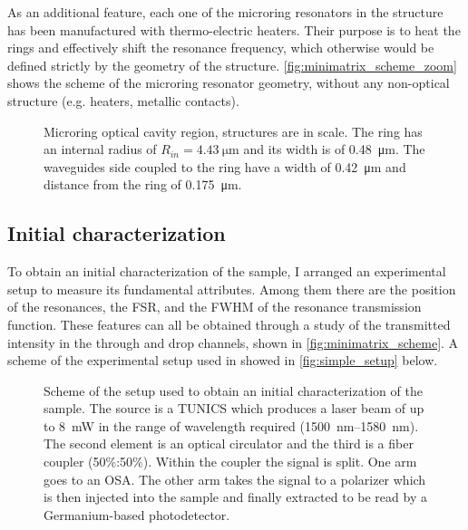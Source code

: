 As an additional feature, each one of the microring resonators in the structure has been manufactured with thermo-electric heaters.
Their purpose \cite{testa2016design} is to heat the rings and effectively shift the resonance frequency, which otherwise would be defined strictly by the geometry of the structure.
\autoref{fig:minimatrix_scheme_zoom} shows the scheme of the microring resonator geometry, without any non-optical structure (e.g. heaters, metallic contacts).

\begin{figure}[htbp]
	\centering
	
	\caption{
	Microring optical cavity region, structures are in scale.
	The ring has an internal radius of $R_{in}=\SI{4.43}{\um}$ and its width is of \SI{0.48}{\um}.
	The waveguides side coupled to the ring have a width of \SI{0.42}{\um} and distance from the ring of \SI{.175}{\um}.
	}
	\label{fig:minimatrix_scheme_zoom}
\end{figure}

\subsection{Initial characterization}
\label{ssec:initial_characterization}
To obtain an initial characterization of the sample, I arranged an experimental setup to measure its fundamental attributes.
Among them there are the position of the resonances, the \acf{FSR}, and the \acf{FWHM} of the resonance transmission function.
These features can all be obtained through a study of the transmitted intensity in the through and drop channels, shown in \autoref{fig:minimatrix_scheme}.
A scheme of the experimental setup used in showed in \autoref{fig:simple_setup} below.

\begin{figure}
	\centering
	
	\caption{Scheme of the setup used to obtain an initial characterization of the sample.
		The source is a TUNICS which produces a laser beam of up to \SI{8}{\mW} in the range of wavelength required (\SIrange{1500}{1580}{\nm}).
		The second element is an optical circulator and the third is a fiber coupler (50\%:50\%).
		Within the coupler the signal is split. One arm goes to an \ac{OSA}.
		The other arm takes the signal to a polarizer which is then injected into the sample and finally extracted to be read by a Germanium-based photodetector.
		}
	\label{fig:simple_setup}
\end{figure}

